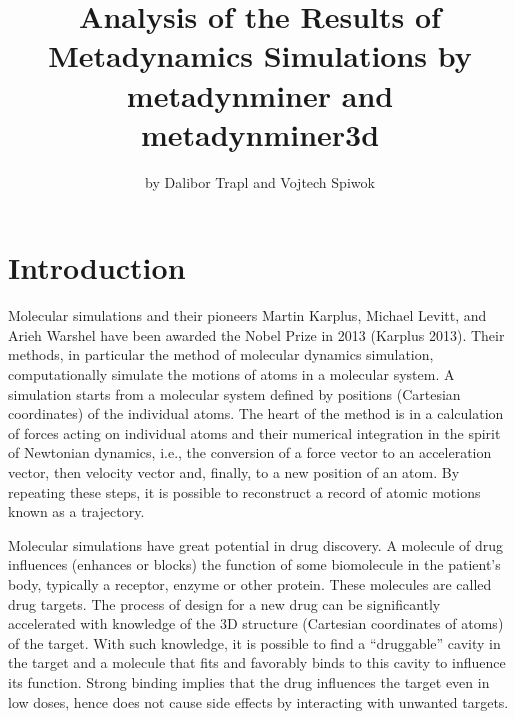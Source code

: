 \title{Analysis of the Results of Metadynamics Simulations by metadynminer and metadynminer3d}
\author{by Dalibor Trapl and Vojtech Spiwok}

\maketitle


\hypertarget{introduction}{%
\section{Introduction}\label{introduction}}

Molecular simulations and their pioneers Martin Karplus, Michael Levitt, and Arieh Warshel
have been awarded the Nobel Prize in 2013 (Karplus 2013). Their methods, in particular the method
of molecular dynamics simulation, computationally simulate the motions of atoms in a molecular
system. A simulation starts from a molecular system defined by positions (Cartesian
coordinates) of the individual atoms. The heart of the method is in a calculation of forces acting
on individual atoms and their numerical integration in the spirit of
Newtonian dynamics, i.e., the conversion of a force vector to an acceleration vector, then
velocity vector and, finally, to a new position of an atom. By repeating these steps,
it is possible to reconstruct a record of atomic motions known as a trajectory.

Molecular simulations have great potential in drug discovery. A molecule of drug
influences (enhances or blocks) the function of some biomolecule in the patient's
body, typically a receptor, enzyme or other protein. These molecules are called
drug targets. The process of design for a new drug can be significantly accelerated with knowledge
of the 3D structure (Cartesian coordinates of atoms) of the target.
With such knowledge, it is possible to find a ``druggable'' cavity in
the target and a molecule that fits and favorably binds
to this cavity to influence its function.
Strong binding implies that the drug influences the target even in low doses, hence
does not cause side effects by interacting with unwanted targets.

